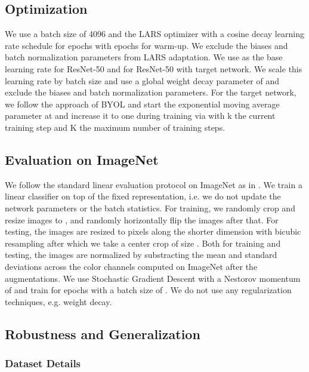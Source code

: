 \documentclass{article}
\begin{document}
\subsection{Optimization}
We use a batch size of 4096 and the LARS optimizer \citep{you2017large} with a cosine decay learning rate schedule \citep{Loshchilov2017SGDRSG} for  epochs with  epochs for warm-up. 
We exclude the biases and batch normalization parameters from LARS adaptation.
We use as the base learning rate  for ResNet-50 and  for ResNet-50 with target network.
We scale this learning rate by batch size and use a global weight decay parameter of
 and exclude the biases and batch normalization parameters.
For the target network, we follow the approach of BYOL \citep{grill2020bootstrap} and start the exponential moving average parameter  at  and increase it to one during training via  with k the current training
step and K the maximum number of training steps.
 
\subsection{Evaluation on ImageNet} \label{sec:linear_imagenet_app}

We follow the standard linear evaluation protocol on ImageNet as in \citep{Kolesnikov2019RevisitingSV,chen2020simple,grill2020bootstrap}.
We train a linear classifier on top of the fixed representation, i.e. we do not update the network parameters or the batch statistics.
For training, we randomly crop and resize images to , and randomly horizontally flip the images after that.
For testing, the images are resized to  pixels along the shorter dimension with bicubic resampling after which we take a center crop of size .
Both for training and testing, the images are normalized by substracting the mean and standard deviations across the color channels computed on ImageNet after the augmentations.
We use Stochastic Gradient Descent with a Nestorov momentum of  and train for  epochs with a batch size of .
We do not use any regularization techniques, e.g. weight decay.

\subsection{Robustness and Generalization}  \label{sec:robust_app}

\subsubsection{Dataset Details} \label{sec:robust_app.data}
\end{document}
